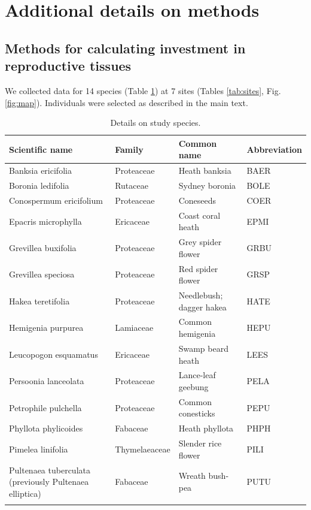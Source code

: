 \documentclass[10pt,twoside]{article}\usepackage[]{graphicx}\usepackage[]{color}
\begin{document}
\clearpage


\section{Additional details on methods}

\subsection{Methods for calculating investment in reproductive tissues}

We collected data for 14 species (Table \ref{tab:species}) at 7 sites (Tables \ref{tab:sites}, Fig. \ref{fig:map}). Individuals were selected as described in the main text.

\begingroup\small
\begin{longtable}{p{5cm}p{3cm}p{5cm}p{2cm}}
\caption{Details on study species.} \\ 
  \hline
Scientific name & Family & Common name & Abbreviation \\ 
  \hline
Banksia ericifolia & Proteaceae & Heath banksia & BAER \\ 
  Boronia ledifolia & Rutaceae & Sydney boronia & BOLE \\ 
  Conospermum ericifolium & Proteaceae & Coneseeds & COER \\ 
  Epacris microphylla & Ericaceae & Coast coral heath & EPMI \\ 
  Grevillea buxifolia & Proteaceae & Grey spider flower & GRBU \\ 
  Grevillea speciosa & Proteaceae & Red spider flower & GRSP \\ 
  Hakea teretifolia & Proteaceae & Needlebush; dagger hakea & HATE \\ 
  Hemigenia purpurea  & Lamiaceae & Common hemigenia & HEPU \\ 
  Leucopogon esquamatus & Ericaceae & Swamp beard heath & LEES \\ 
  Persoonia lanceolata & Proteaceae & Lance-leaf geebung & PELA \\ 
  Petrophile pulchella & Proteaceae & Common conesticks & PEPU \\ 
  Phyllota phylicoides & Fabaceae & Heath phyllota & PHPH \\ 
  Pimelea linifolia & Thymelaeaceae & Slender rice flower & PILI \\ 
  Pultenaea tuberculata (previously Pultenaea elliptica) & Fabaceae & Wreath bush-pea & PUTU \\ 
   \hline
\hline
\label{tab:species}
\end{longtable}
\end{document}
